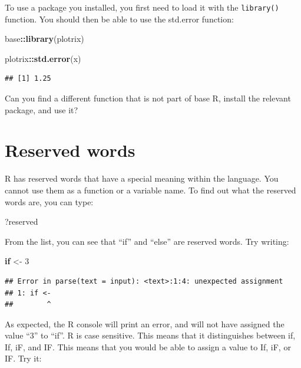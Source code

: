 \documentclass[
]{book}
\newenvironment{Shaded}{\begin{snugshade}}{\end{snugshade}}
\newcommand{\ControlFlowTok}[1]{\textcolor[rgb]{0.13,0.29,0.53}{\textbf{#1}}}
\newcommand{\DecValTok}[1]{\textcolor[rgb]{0.00,0.00,0.81}{#1}}
\newcommand{\FunctionTok}[1]{\textcolor[rgb]{0.13,0.29,0.53}{\textbf{#1}}}
\newcommand{\NormalTok}[1]{#1}
\newcommand{\OtherTok}[1]{\textcolor[rgb]{0.56,0.35,0.01}{#1}}
\newcommand{\SpecialCharTok}[1]{\textcolor[rgb]{0.81,0.36,0.00}{\textbf{#1}}}
\begin{document}
To use a package you installed, you first need to load it with the \texttt{library()} function. You should then be able to use the std.error function:

\begin{Shaded}
\begin{Highlighting}[]
\NormalTok{base}\SpecialCharTok{::}\FunctionTok{library}\NormalTok{(plotrix)}

\NormalTok{plotrix}\SpecialCharTok{::}\FunctionTok{std.error}\NormalTok{(x)}
\end{Highlighting}
\end{Shaded}

\begin{verbatim}
## [1] 1.25
\end{verbatim}

Can you find a different function that is not part of base R, install the relevant package, and use it?

\section{Reserved words}\label{sec:reservedWords}

R has reserved words that have a special meaning within the language. You cannot use them as a function or a variable name. To find out what the reserved words are, you can type:

\begin{Shaded}
\begin{Highlighting}[]
\NormalTok{?reserved}
\end{Highlighting}
\end{Shaded}

From the list, you can see that ``if'' and ``else'' are reserved words. Try writing:

\begin{Shaded}
\begin{Highlighting}[]
\ControlFlowTok{if} \OtherTok{\textless{}{-}} \DecValTok{3}
\end{Highlighting}
\end{Shaded}

\begin{verbatim}
## Error in parse(text = input): <text>:1:4: unexpected assignment
## 1: if <-
##        ^
\end{verbatim}

As expected, the R console will print an error, and will not have assigned the value ``3'' to ``if''. R is case sensitive. This means that it distinguishes between if, If, iF, and IF. This means that you would be able to assign a value to If, iF, or IF. Try it:
\end{document}
